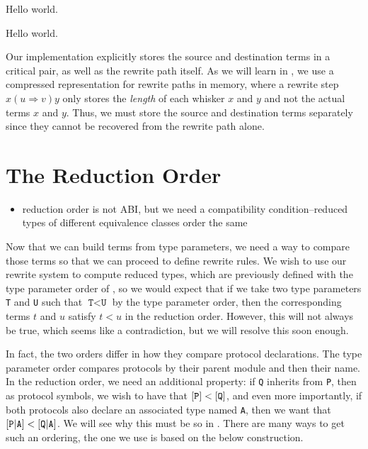 \documentclass[../generics]{subfiles}
\begin{document}
\begin{algorithm}\label{trie lookup algo}
Hello world.
\end{algorithm}

\begin{algorithm}\label{term reduction trie algo}
Hello world.
\end{algorithm}

Our implementation explicitly stores the source and destination terms in a critical pair, as well as the rewrite path itself. As we will learn in , we use a compressed representation for rewrite paths in memory, where a rewrite step $x(u\Rightarrow v)y$ only stores the \emph{length} of each whisker $x$ and $y$ and not the actual terms $x$ and $y$. Thus, we must store the source and destination terms separately since they cannot be recovered from the rewrite path alone.

\section{The Reduction Order}\label{reduction order}

\begin{itemize}
\item reduction order is not ABI, but we need a compatibility condition--reduced types of different equivalence classes order the same
\end{itemize}

%

Now that we can build terms from type parameters, we need a way to compare those terms so that we can proceed to define rewrite rules. We wish to use our rewrite system to compute reduced types, which are previously defined with the type parameter order of , so we would expect that if we take two type parameters \texttt{T} and \texttt{U} such that $\texttt{T}<\texttt{U}$ by the type parameter order, then the corresponding terms $t$ and $u$ satisfy $t<u$ in the reduction order. However, this will not always be true, which seems like a contradiction, but we will resolve this soon enough.

In fact, the two orders differ in how they compare protocol declarations. The type parameter order compares protocols by their parent module and then their name. In the reduction order, we need an additional property: if \texttt{Q} inherits from \texttt{P}, then as protocol symbols, we wish to have that $[\texttt{P}]<[\texttt{Q}]$, and even more importantly, if both protocols also declare an associated type named \texttt{A}, then we want that $[\texttt{P}|\texttt{A}]<[\texttt{Q}|\texttt{A}]$. We will see why this must be so in . There are many ways to get such an ordering, the one we use is based on the below construction.
\end{document}
